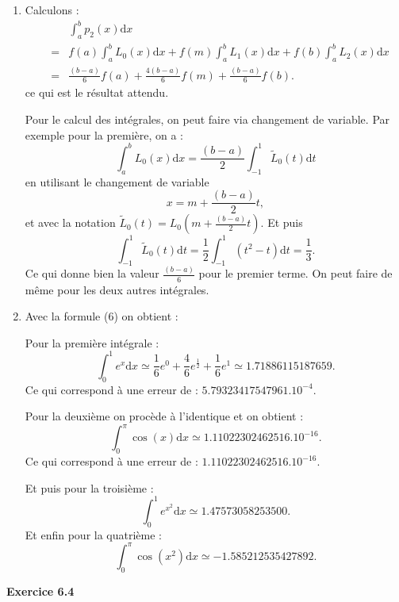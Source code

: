 \documentclass{article}
\begin{document}
\begin{enumerate}
    \item Calculons :
    \begin{eqnarray*}
    & & \int_a^b p_2(x) \mathrm{d}x\\
    & = &
    f(a) \int_a^b L_0(x) \mathrm{d}x 
    + f(m) \int_a^b L_1(x) \mathrm{d}x
    + f(b) \int_a^b L_2(x) \mathrm{d}x \\
    &=& \frac{(b-a)}{6} f(a)
    + \frac{4(b-a)}{6} f(m)
    + \frac{(b-a)}{6} f(b).
    \end{eqnarray*}
    ce qui est le résultat attendu.
    
    Pour le calcul des intégrales, on peut faire via changement de variable. Par exemple pour la première, on a :
    \[
    \int_a^b L_0(x) \mathrm{d}x
    = \frac{(b-a)}{2}
    \int_{-1}^1 \widetilde L_0 ( t) \mathrm{d}t 
    \]
    en utilisant le changement de variable
    \[
    x = m + \frac{(b-a)}{2} t,
    \]
    et avec la notation $\widetilde L_0 ( t) = L_0 ( m + \frac{(b-a)}{2} t ) $.
    Et puis
    \[
    \int_{-1}^1 \widetilde L_0 ( t) \mathrm{d}t 
    =
    \frac12 \int_{-1}^1 (t^2 - t) \mathrm{d}t = \frac13.
    \]
    Ce qui donne bien la valeur $\frac{(b-a)}{6}$ pour le premier terme. On peut faire de même pour les deux autres intégrales.
    
    \item Avec la formule (6) on obtient :

    Pour la première intégrale :
    \[
    \int_0^1 e^x \mathrm{d}x 
    \simeq
    \frac16 e^0 + \frac46 e^{\frac12} + \frac16 e^1
    \simeq 1.71886115187659.
    \]
    Ce qui correspond à une erreur de : $5.79323417547961.10^{-4}$.
    
    Pour la deuxième on procède à l'identique et on obtient :
    \[
    \int_0^\pi \cos(x) \mathrm{d}x \simeq 1.11022302462516.10^{-16}. 
    \]
    Ce qui correspond à une erreur de : $1.11022302462516.10^{-16}$.


    Et puis pour la troisième : 
    \[
    \int_0^1 e^{x^2} \mathrm{d}x \simeq 1.47573058253500.
    \]
    Et enfin pour la quatrième : 
    \[
    \int_0^\pi \cos(x^2) \mathrm{d}x \simeq -1.585212535427892. 
    \]

\end{enumerate}

{\bf Exercice 6.4}
\end{document}
